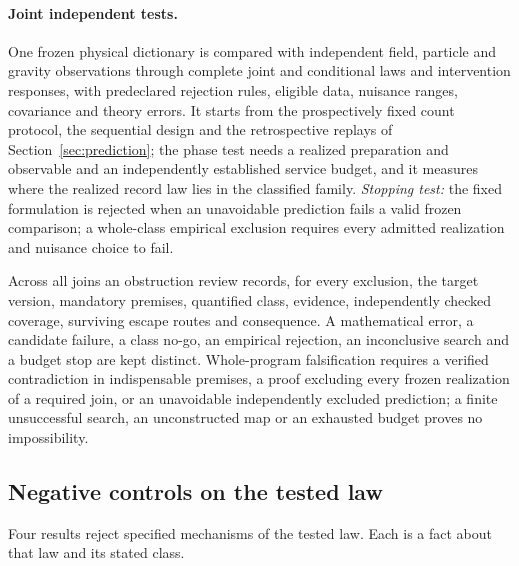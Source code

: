 \documentclass[11pt]{article}
\theoremstyle{definition}
\theoremstyle{remark}
\theoremstyle{plain}
\begin{document}
\paragraph{Joint independent tests.} One frozen physical dictionary is
compared with independent field, particle and gravity observations through
complete joint and conditional laws and intervention responses, with
predeclared rejection rules, eligible data, nuisance ranges, covariance and
theory errors. It starts from the prospectively fixed count protocol, the
sequential design and the retrospective replays of
Section~\ref{sec:prediction}; the phase test needs a realized preparation and
observable and an independently established service budget, and it measures
where the realized record law lies in the classified family. \emph{Stopping
test:} the fixed formulation is rejected when an unavoidable prediction fails
a valid frozen comparison; a whole-class empirical exclusion requires every
admitted realization and nuisance choice to fail.

Across all joins an obstruction review records, for every exclusion, the
target version, mandatory premises, quantified class, evidence, independently
checked coverage, surviving escape routes and consequence. A mathematical
error, a candidate failure, a class no-go, an empirical rejection, an
inconclusive search and a budget stop are kept distinct. Whole-program
falsification requires a verified contradiction in indispensable premises, a
proof excluding every frozen realization of a required join, or an
unavoidable independently excluded prediction; a finite unsuccessful search,
an unconstructed map or an exhausted budget proves no impossibility.

\subsection{Negative controls on the tested law}
\label{sec:negative-controls}

Four results reject specified mechanisms of the tested law. Each is a fact
about that law and its stated class.
\end{document}

